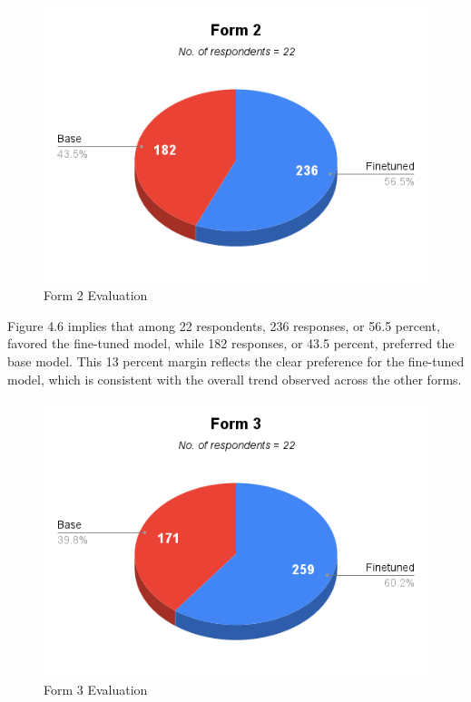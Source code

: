 \begin{figure}[H]
	\centering
	\includegraphics[scale=0.7]{figures/Form2.png}
	\caption{Form 2 Evaluation}
\end{figure}

Figure 4.6 implies that among 22 respondents, 236 responses, or 56.5 percent, favored the fine-tuned model, while 182 responses, or 43.5 percent, preferred the base model. This 13 percent margin reflects the clear preference for the fine-tuned model, which is consistent with the overall trend observed across the other forms. 

\begin{figure}[H]
	\centering
	\includegraphics[scale=0.7]{figures/Form3.png}
	\caption{Form 3 Evaluation}
\end{figure}

